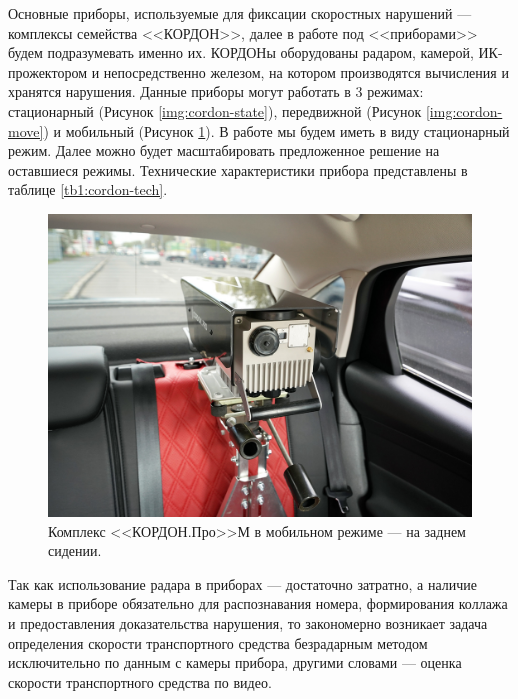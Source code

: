 \documentclass[specification,annotation,times]{itmo-student-thesis}
\begin{document}
Основные приборы, используемые для фиксации скоростных нарушений --- комплексы семейства <<КОРДОН>>, далее в работе под <<приборами>> будем подразумевать именно их. КОРДОНы оборудованы радаром, камерой, ИК-прожектором и непосредственно железом, на котором производятся вычисления и хранятся нарушения. Данные приборы могут работать в 3 режимах: стационарный (Рисунок \ref{img:cordon-state}), передвижной (Рисунок \ref{img:cordon-move}) и мобильный (Рисунок \ref{img:cordon-mobile}). В работе мы будем иметь в виду стационарный режим. Далее можно будет масштабировать предложенное решение на оставшиеся режимы. Технические характеристики прибора представлены в таблице \ref{tb1:cordon-tech}.

\begin{figure}[!ht]
	\caption{Комплекс <<КОРДОН.Про>>М в мобильном режиме --- на заднем сидении.}\label{img:cordon-mobile}
	\includegraphics[width=0.85\linewidth]{../png/cordon_pro_d_auto.jpg}
	\centering
\end{figure}

Так как использование радара в приборах --- достаточно затратно, а наличие камеры в приборе обязательно для распознавания номера, формирования коллажа и предоставления доказательства нарушения, то закономерно возникает задача определения скорости транспортного средства безрадарным методом исключительно по данным с камеры прибора, другими словами --- оценка скорости транспортного средства по видео.
\end{document}

